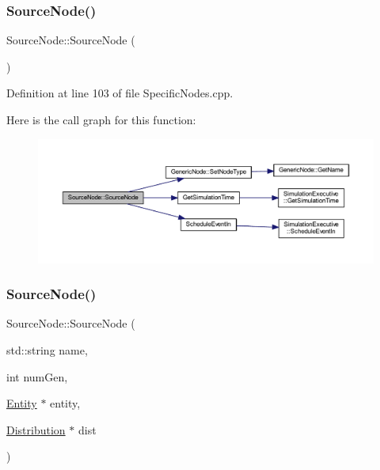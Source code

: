 \subsubsection{\texorpdfstring{Source\+Node()}{SourceNode()}\hspace{0.1cm}{\footnotesize\ttfamily [1/3]}}
{\footnotesize\ttfamily Source\+Node\+::\+Source\+Node (\begin{DoxyParamCaption}{ }\end{DoxyParamCaption})}



Definition at line 103 of file Specific\+Nodes.\+cpp.

Here is the call graph for this function\+:
\nopagebreak
\begin{figure}[H]
\begin{center}
\leavevmode
\includegraphics[width=350pt]{class_source_node_abb26d83cef2e50b0add1499a05e6905d_cgraph}
\end{center}
\end{figure}
\mbox{\label{class_source_node_aad28db9c905ffdccd8013bc1e4481848}} 
\subsubsection{\texorpdfstring{Source\+Node()}{SourceNode()}\hspace{0.1cm}{\footnotesize\ttfamily [2/3]}}
{\footnotesize\ttfamily Source\+Node\+::\+Source\+Node (\begin{DoxyParamCaption}\item[{std\+::string}]{name,  }\item[{int}]{num\+Gen,  }\item[{\hyperlink{class_entity}{Entity} $\ast$}]{entity,  }\item[{\hyperlink{class_distribution}{Distribution} $\ast$}]{dist }\end{DoxyParamCaption})}



